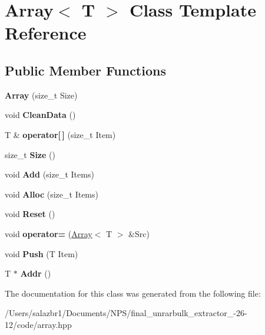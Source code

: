 \hypertarget{class_array}{\section{Array$<$ T $>$ Class Template Reference}
\label{class_array}
}
\subsection*{Public Member Functions}
\begin{DoxyCompactItemize}
\item 
\hypertarget{class_array_a76b75c2b76210689c42d6a3966b2bbb4}{{\bfseries Array} (size\-\_\-t Size)}\label{class_array_a76b75c2b76210689c42d6a3966b2bbb4}

\item 
\hypertarget{class_array_a9c4bde1217ea8505dd7cbf4543402e91}{void {\bfseries Clean\-Data} ()}\label{class_array_a9c4bde1217ea8505dd7cbf4543402e91}

\item 
\hypertarget{class_array_ad89a95323691b7a5f34b2ef10d59cd2c}{T \& {\bfseries operator\mbox{[}$\,$\mbox{]}} (size\-\_\-t Item)}\label{class_array_ad89a95323691b7a5f34b2ef10d59cd2c}

\item 
\hypertarget{class_array_a769e23dfe90cfd7ad1f55d771d164644}{size\-\_\-t {\bfseries Size} ()}\label{class_array_a769e23dfe90cfd7ad1f55d771d164644}

\item 
\hypertarget{class_array_a8173b0dc2fb6d869bdd8ee0da49cb8a7}{void {\bfseries Add} (size\-\_\-t Items)}\label{class_array_a8173b0dc2fb6d869bdd8ee0da49cb8a7}

\item 
\hypertarget{class_array_aa321acfbc75a9f248c0607d690890087}{void {\bfseries Alloc} (size\-\_\-t Items)}\label{class_array_aa321acfbc75a9f248c0607d690890087}

\item 
\hypertarget{class_array_a9676592932b3b1b43fdd2fd80baed764}{void {\bfseries Reset} ()}\label{class_array_a9676592932b3b1b43fdd2fd80baed764}

\item 
\hypertarget{class_array_a76e715e60794c3b71e385e05f4761a8b}{void {\bfseries operator=} (\hyperlink{class_array}{Array}$<$ T $>$ \&Src)}\label{class_array_a76e715e60794c3b71e385e05f4761a8b}

\item 
\hypertarget{class_array_ad3773cbc7c7b8a865f448fc8f74658aa}{void {\bfseries Push} (T Item)}\label{class_array_ad3773cbc7c7b8a865f448fc8f74658aa}

\item 
\hypertarget{class_array_ad9faf2ae8a9aa0a63fed50d273e97a56}{T $\ast$ {\bfseries Addr} ()}\label{class_array_ad9faf2ae8a9aa0a63fed50d273e97a56}

\end{DoxyCompactItemize}


The documentation for this class was generated from the following file\-:\begin{DoxyCompactItemize}
\item 
/\-Users/salazbr1/\-Documents/\-N\-P\-S/final\-\_\-unrarbulk\-\_\-extractor\-\_-\/26-\/12/code/array.\-hpp\end{DoxyCompactItemize}

